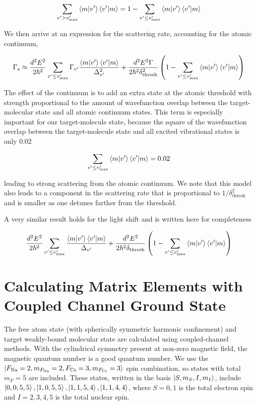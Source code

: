\documentclass[aps,secnumarabic,amsmath,amssymb,superscriptaddress]{revtex4}
\newcommand{\todo}[1]{}
\begin{document}
\begin{equation}
    \displaystyle\sum_{v' > v'_{\text{max}}}\braket{m|v'}\braket{v'|m} = 1 - \displaystyle\sum_{v' \leq v'_{\text{max}}}\braket{m|v'}\braket{v'|m}
\end{equation}

We then arrive at an expression for the scattering rate, accounting for the atomic continuum,

\begin{equation}
    \Gamma_s \approx \frac{d^2E^2}{2\hbar^2}\displaystyle\sum_{v' \leq v'_{\text{max}}}\Gamma_{v'} \frac{\braket{m|v'}\braket{v'|m}}{\Delta_{v'}^2} +  \frac{d^2E^2\Gamma}{2\hbar^2\delta_{\text{thresh}}^2}\left(1 - \displaystyle\sum_{v' \leq v'_{\text{max}}}\braket{m|v'}\braket{v'|m}\right)
\end{equation}

The effect of the continuum is to add an extra state at the atomic threshold with strength proportional to the amount of wavefunction overlap between the target-molecular state and all atomic continuum states. This term is especially important for our target-molecule state, because the square of the wavefunction overlap between the target-molecule state and all excited vibrational states is only 0.02

\begin{equation}
\displaystyle\sum_{v' \leq v'_{\text{max}}}\braket{m|v'}\braket{v'|m} = 0.02
\end{equation}

leading to strong scattering from the atomic continuum. We note that this model also leads to a component in the scattering rate that is proportional to $ 1/\delta_{\text{thresh}}^2$ and is smaller as one detunes farther from the threshold. 

A very similar result holds for the light shift and is written here for completeness

\begin{equation}
    \frac{d^2E^2}{2\hbar^2}\displaystyle\sum_{v' \leq v'_{\text{max}}} \frac{\braket{m|v'}\braket{v'|m}}{\Delta_{v'}} +  \frac{d^2E^2}{2\hbar^2\delta_{\text{thresh}}}\left(1 - \displaystyle\sum_{v' \leq v'_{\text{max}}}\braket{m|v'}\braket{v'|m}\right)
\end{equation}


\section{Calculating Matrix Elements with Coupled Channel Ground State}
The free atom state (with spherically symmetric harmonic confinement) and target weakly-bound molecular state are calculated using coupled-channel methods. With the cylindrical symmetry present at non-zero magnetic field, the magnetic quantum number is a good quantum number. We use the $ \ket{F_{\text{Na}} = 2, m_{F_{\text{Na}}} = 2, F_{\text{Cs}} = 3, m_{F_{\text{Cs}}} = 3}$ spin combination, so states with total $ m_F = 5 $ are included. These states, written in the basis $ \ket{S, m_S, I, m_I}$, include $ \ket{0,0,5,5}, \ket{1,0,5,5}, \ket{1,1,5,4}, \ket{1,1,4,4} $, where $S = 0,1$ is the total electron spin and $ I = 2,3,4,5 $ is the total nuclear spin. 

\todo{
  Power/intensity calibration
}


\end{document}
